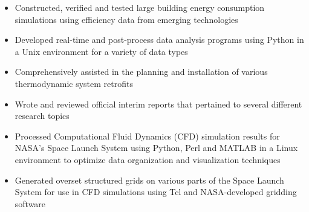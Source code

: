 \documentclass[10pt,a4paper,ragged2e]{altacv}
\begin{document}
\divider

\begin{itemize}
  \item Constructed, verified and tested large building energy consumption simulations using efficiency data from emerging technologies 
\end{itemize}

\begin{itemize}
  \item Developed real-time and post-process data analysis programs using Python in a Unix environment for a variety of data types
  \item Comprehensively assisted in the planning and installation of various thermodynamic system retrofits
  \item Wrote and reviewed official interim reports that pertained to several different research topics
\end{itemize}

\divider

\begin{itemize}
  \item Processed Computational Fluid Dynamics (CFD) simulation results for NASA's Space Launch System using Python, Perl and MATLAB in a Linux environment to optimize data organization and visualization techniques 
  \item Generated overset structured grids on various parts of the Space Launch System for use in CFD simulations using Tcl and NASA-developed gridding software
\end{itemize}

\clearpage

\nocite{*}
\end{document}
